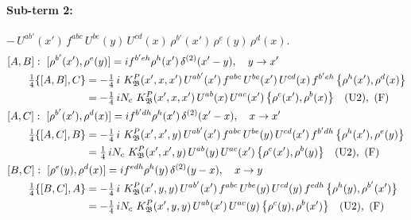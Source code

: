 \documentclass[10pt]{article}
\numberwithin{equation}{section}
\begin{document}
\paragraph{Sub-term 2:} $-\,U^{ab'}(x')\,f^{abc}\,U^{be}(y)\,U^{cd}(x)\,\rho^{b'}(x')\,\rho^{e}(y)\,\rho^{d}(x)$.
\begin{align}
&[A,B]:\ [\rho^{b'}(x'),\rho^{e}(y)]=i f^{b'eh}\rho^{h}(x')\,\delta^{(2)}(x'-y),\quad y\to x'\notag\\
&\qquad \tfrac14\{[A,B],C\}=-\tfrac14\,i\,\,K^{P}_{\mathfrak B}(x',x,x')\,U^{ab'}(x')\,f^{abc}\,U^{be}(x')\,U^{cd}(x)\,f^{b'eh}\,\big\{\rho^{h}(x'),\rho^{d}(x)\big\}\notag\\
&\qquad\phantom{\tfrac14\{[A,B],C\}}=-\tfrac14\,i N_{c}\,\,K^{P}_{\mathfrak B}(x',x,x')\,U^{ab}(x)\,U^{ac}(x')\,\big\{\rho^{c}(x'),\rho^{b}(x)\big\}\quad\text{(U2)},\ \text{(F)}
\label{B:eq:GI.IV.P-2-AB}\\
&[A,C]:\ [\rho^{b'}(x'),\rho^{d}(x)]=i f^{b'dh}\rho^{h}(x')\,\delta^{(2)}(x'-x),\quad x\to x'\notag\\
&\qquad \tfrac14\{[A,C],B\}=-\tfrac14\,i\,\,K^{P}_{\mathfrak B}(x',x',y)\,U^{ab'}(x')\,f^{abc}\,U^{be}(y)\,U^{cd}(x')\,f^{b'dh}\,\big\{\rho^{h}(x'),\rho^{e}(y)\big\}\notag\\
&\qquad\phantom{\tfrac14\{[A,C],B\}}=\tfrac14\,i N_{c}\,\,K^{P}_{\mathfrak B}(x',x',y)\,U^{ab}(y)\,U^{ac}(x')\,\big\{\rho^{c}(x'),\rho^{b}(y)\big\}\quad\text{(U2)},\ \text{(F)}
\label{B:eq:GI.IV.P-2-AC}\\
&[B,C]:\ [\rho^{e}(y),\rho^{d}(x)]=i f^{edh}\rho^{h}(y)\,\delta^{(2)}(y-x),\quad x\to y\notag\\
&\qquad \tfrac14\{[B,C],A\}=-\tfrac14\,i\,\,K^{P}_{\mathfrak B}(x',y,y)\,U^{ab'}(x')\,f^{abc}\,U^{be}(y)\,U^{cd}(y)\,f^{edh}\,\big\{\rho^{h}(y),\rho^{b'}(x')\big\}\notag\\
&\qquad\phantom{\tfrac14\{[B,C],A\}}=-\tfrac14\,i N_{c}\,\,K^{P}_{\mathfrak B}(x',y,y)\,U^{ab}(x')\,U^{ac}(y)\,\big\{\rho^{c}(y),\rho^{b}(x')\big\}\quad\text{(U2)},\ \text{(F)}
\label{B:eq:GI.IV.P-2-BC}
\end{align}
\end{document}
